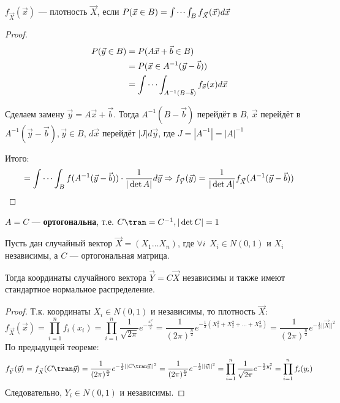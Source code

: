\begin{remark}
    \(f_{ \vec{X}}(\vec{x})\) --- плотность \(\vec{X}\), если \(P(\vec{x} \in B) = \idotsint_{B} f_{ \vec{X}}(\vec{x}) d \vec{x}\)
\end{remark}

\begin{proof}
    \begin{align*}
        P(\vec{y} \in B) & = P(A \vec{x} + \vec{b} \in B)                              \\
                         & = P(\vec{x} \in A^{-1}(\vec{y} - \vec{b}))                  \\
                         & = \idotsint_{A^{-1}(B - \vec{b})} f_{ \vec{x}}(x) d \vec{x}
    \end{align*}

    Сделаем замену \(\vec{y} = A \vec{x} + \vec{b}\). Тогда \(A^{-1}(B - \vec{b})\) перейдёт в \(B\), \(\vec{x}\) перейдёт в \(A^{-1}(\vec{y} - \vec{b}), \vec{y} \in B\), \(d \vec{x}\) перейдёт  \(|J| d \vec{y}\), где \(J = |A^{-1}| = |A|^{ - 1}\)

    Итого:
    \[ = \idotsint_B f(A^{-1}(\vec{y} - \vec{b})) \cdot \frac{1}{|\det A|} d \vec{y} \Rightarrow f_{ \vec{Y}}(\vec{y}) = \frac{1}{|\det A|} f_{ \vec{X}}(A^{-1}(\vec{y} - \vec{b}))\]
\end{proof}

\begin{definition}
    \(A = C\) --- \textbf{ортогональна}, т.е. \(C\tran = C^{-1}, |\det C| = 1\)
\end{definition}

\begin{theorem}
    Пусть дан случайный вектор \(\vec{X} = (X_1 \dots X_n)\), где \(\forall i \ \ X_i \in N(0, 1)\) и \(X_i\) независимы, а \(C\) --- ортогональная матрица.

    Тогда координаты случайного вектора \(\vec{Y} = C \vec{X}\) независимы и также имеют стандартное нормальное распределение.
\end{theorem}
\begin{proof}
    Т.к. координаты \(X_i \in N(0, 1)\) и независимы, то плотность \(\vec{X}\):
    \[f_{ \vec{X}}(\vec{x}) = \prod_{i=1}^{n} f_i (x_i) = \prod_{i=1}^{n} \frac{1}{\sqrt{2 \pi}} e^{ - \frac{x_i^2}{2}} = \frac{1}{(2 \pi)^{\frac{n}{2}}} e^{ - \frac{1}{2} (X_1^2 + X_2^2 + \dots + X_n^2)} = \frac{1}{(2 \pi)^{\frac{n}{2}}} e^{ - \frac{1}{2} ||\vec{X}||^2}\]
    По предыдущей теореме:
    \[f_{ \vec{Y}}(\vec{y}) = f_{ \vec{X}}(C\tran \vec{y}) = \frac{1}{(2 \pi)^{\frac{n}{2}}} e^{ - \frac{1}{2} ||C\tran \vec{y}||^2} = \frac{1}{(2 \pi)^{\frac{n}{2}}} e^{ - \frac{1}{2} ||\vec{y}||^2} = \prod_{i=1}^{n} \frac{1}{\sqrt{2 \pi}} e^{ - \frac{1}{2} y_i^2} = \prod_{i=1}^{n} f_i(y_i)\]
    Следовательно, \(Y_i \in N(0, 1)\) и независимы.
\end{proof}

